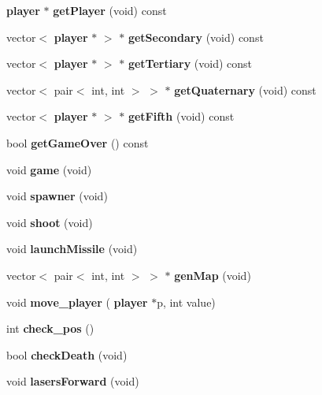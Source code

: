\begin{DoxyCompactItemize}
\item 
\mbox{\label{classsolarfox_a395d25edb3da264e01ca7798e80357ab}} 
\textbf{ player} $\ast$ {\bfseries get\+Player} (void) const
\item 
\mbox{\label{classsolarfox_a5b7e761a3135ceab166d44020a8951ab}} 
vector$<$ \textbf{ player} $\ast$ $>$ $\ast$ {\bfseries get\+Secondary} (void) const
\item 
\mbox{\label{classsolarfox_af9fcc28b586985bc8ea47f6036a5801d}} 
vector$<$ \textbf{ player} $\ast$ $>$ $\ast$ {\bfseries get\+Tertiary} (void) const
\item 
\mbox{\label{classsolarfox_a7d2cf72fd374768d04e4dc184da4e406}} 
vector$<$ pair$<$ int, int $>$ $>$ $\ast$ {\bfseries get\+Quaternary} (void) const
\item 
\mbox{\label{classsolarfox_aa6ea976c2b26ac2bf1cccf72af59c769}} 
vector$<$ \textbf{ player} $\ast$ $>$ $\ast$ {\bfseries get\+Fifth} (void) const
\item 
\mbox{\label{classsolarfox_a0104f3fe7bbcaf7510a152fbe3e7e27b}} 
bool {\bfseries get\+Game\+Over} () const
\item 
\mbox{\label{classsolarfox_a6f224bd7f2b60bd8adf1791054d00e93}} 
void {\bfseries game} (void)
\item 
\mbox{\label{classsolarfox_a2612b957b4bc234ec6aa2132699fb50f}} 
void {\bfseries spawner} (void)
\item 
\mbox{\label{classsolarfox_ad324290ede25c99cadb7a62310648ef4}} 
void {\bfseries shoot} (void)
\item 
\mbox{\label{classsolarfox_ab6504ee8365eea828d20e5f5d0e699ec}} 
void {\bfseries launch\+Missile} (void)
\item 
\mbox{\label{classsolarfox_a270a5f4d3f55d8b33f91434920d3a86b}} 
vector$<$ pair$<$ int, int $>$ $>$ $\ast$ {\bfseries gen\+Map} (void)
\item 
\mbox{\label{classsolarfox_ad762204619d4517cf2d5ca788eeaedb5}} 
void {\bfseries move\+\_\+player} (\textbf{ player} $\ast$p, int value)
\item 
\mbox{\label{classsolarfox_a9406fe341b5a325a3ffcd0eb3137407e}} 
int {\bfseries check\+\_\+pos} ()
\item 
\mbox{\label{classsolarfox_ab1f2166fe5607be51d4570a38799e27b}} 
bool {\bfseries check\+Death} (void)
\item 
\mbox{\label{classsolarfox_ad246c43f6d2dee67255072ba2be89e1b}} 
void {\bfseries lasers\+Forward} (void)
\item 
\mbox{\label{classsolarfox_a6b504344dd12a73415d44398ff707e8d}} 

\end{DoxyCompactItemize}

